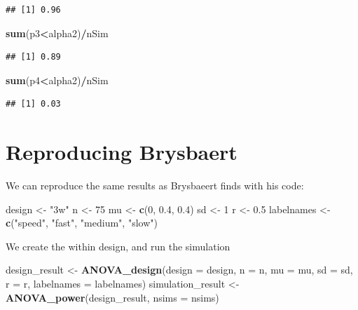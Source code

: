 \documentclass[]{book}
\newenvironment{Shaded}{\begin{snugshade}}{\end{snugshade}}
\newcommand{\DataTypeTok}[1]{\textcolor[rgb]{0.13,0.29,0.53}{#1}}
\newcommand{\DecValTok}[1]{\textcolor[rgb]{0.00,0.00,0.81}{#1}}
\newcommand{\FloatTok}[1]{\textcolor[rgb]{0.00,0.00,0.81}{#1}}
\newcommand{\KeywordTok}[1]{\textcolor[rgb]{0.13,0.29,0.53}{\textbf{#1}}}
\newcommand{\NormalTok}[1]{#1}
\newcommand{\OperatorTok}[1]{\textcolor[rgb]{0.81,0.36,0.00}{\textbf{#1}}}
\newcommand{\StringTok}[1]{\textcolor[rgb]{0.31,0.60,0.02}{#1}}
\begin{document}
\begin{verbatim}
## [1] 0.96
\end{verbatim}

\begin{Shaded}
\begin{Highlighting}[]
\KeywordTok{sum}\NormalTok{(p3}\OperatorTok{<}\NormalTok{alpha2)}\OperatorTok{/}\NormalTok{nSim}
\end{Highlighting}
\end{Shaded}

\begin{verbatim}
## [1] 0.89
\end{verbatim}

\begin{Shaded}
\begin{Highlighting}[]
\KeywordTok{sum}\NormalTok{(p4}\OperatorTok{<}\NormalTok{alpha2)}\OperatorTok{/}\NormalTok{nSim}
\end{Highlighting}
\end{Shaded}

\begin{verbatim}
## [1] 0.03
\end{verbatim}

\hypertarget{reproducing-brysbaert}{%
\section{Reproducing Brysbaert}\label{reproducing-brysbaert}}

We can reproduce the same results as Brysbaeert finds with his code:

\begin{Shaded}
\begin{Highlighting}[]
\NormalTok{design <-}\StringTok{ "3w"}
\NormalTok{n <-}\StringTok{ }\DecValTok{75}
\NormalTok{mu <-}\StringTok{ }\KeywordTok{c}\NormalTok{(}\DecValTok{0}\NormalTok{, }\FloatTok{0.4}\NormalTok{, }\FloatTok{0.4}\NormalTok{)}
\NormalTok{sd <-}\StringTok{ }\DecValTok{1}
\NormalTok{r <-}\StringTok{ }\FloatTok{0.5}
\NormalTok{labelnames <-}\StringTok{ }\KeywordTok{c}\NormalTok{(}\StringTok{"speed"}\NormalTok{, }\StringTok{"fast"}\NormalTok{, }\StringTok{"medium"}\NormalTok{, }\StringTok{"slow"}\NormalTok{)}
\end{Highlighting}
\end{Shaded}

We create the within design, and run the simulation

\begin{Shaded}
\begin{Highlighting}[]
\NormalTok{design_result <-}\StringTok{ }\KeywordTok{ANOVA_design}\NormalTok{(}\DataTypeTok{design =}\NormalTok{ design,}
                   \DataTypeTok{n =}\NormalTok{ n, }
                   \DataTypeTok{mu =}\NormalTok{ mu, }
                   \DataTypeTok{sd =}\NormalTok{ sd, }
                   \DataTypeTok{r =}\NormalTok{ r, }
                   \DataTypeTok{labelnames =}\NormalTok{ labelnames)}
\NormalTok{simulation_result <-}\StringTok{ }\KeywordTok{ANOVA_power}\NormalTok{(design_result, }\DataTypeTok{nsims =}\NormalTok{ nsims)}
\end{Highlighting}
\end{Shaded}
\end{document}
